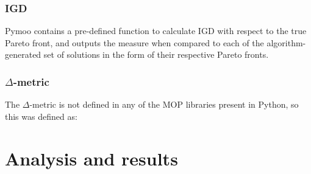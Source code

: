 \documentclass[sigconf,nonacm]{acmart}
\begin{document}
\subsubsection{IGD}
Pymoo contains a pre-defined function to calculate IGD with respect to the true Pareto front, and outputs the measure when compared to each of the algorithm-generated set of solutions in the form of their respective Pareto fronts.
\subsubsection{$\Delta$-metric}
The $\Delta$-metric is not defined in any of the MOP libraries present in Python, so this was defined as:


\section{Analysis and results}
\end{document}
